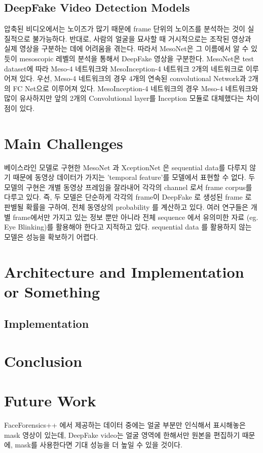 \documentclass{article}
\begin{document}
		\subsection{DeepFake Video Detection Models}
		압축된 비디오에서는 노이즈가 많기 때문에 frame 단위의 노이즈를 분석하는 것이 실질적으로 불가능하다. 반대로, 사람의 얼굴을 묘사할 때 거시적으로는 조작된 영상과 실제 영상을 구분하는 데에 어려움을 겪는다. 따라서 MesoNet은 그 이름에서 알 수 있듯이 mesoscopic 레벨의 분석을 통해서 DeepFake 영상을 구분한다. MesoNet은 test dataset에 따라 Meso-4 네트워크와 MesoInception-4 네트워크 2개의 네트워크로 이루어져 있다. 우선, Meso-4 네트워크의 경우 4개의 연속된 convolutional Network과 2개의 FC Net으로 이루어져 있다. MesoInception-4 네트워크의 경우 Meso-4 네트워크와 많이 유사하지만 앞의 2개의 Convolutional layer를 Inception 모듈로 대체했다는 차이점이 있다.
	
	
	\section{Main Challenges}
	베이스라인 모델로 구현한 MesoNet 과 XceptionNet 은 sequential data를 다루지 않기 때문에 동영상 데이터가 가지는 'temporal feature'를 모델에서 표현할 수 없다. 두 모델의 구현은 개별 동영상 프레임을 잘라내어 각각의 channel 로서 frame corpus를 다루고 있다. 즉, 두 모델은 단순하게 각각의 frame이 DeepFake 로 생성된 frame 로 판별될 확률을 구하여, 전체 동영상의 probability 를 계산하고 있다. 여러 연구들은 개별 frame에서만 가지고 있는 정보 뿐만 아니라 전체 sequence 에서 유의미한 자료 (eg. Eye Blinking)를 활용해야 한다고 지적하고 있다. sequential data 를 활용하지 않는 모델은 성능을 확보하기 어렵다.
	
	\section{Architecture and Implementation or Something}
	

	\subsection{Implementation}
	
	
	
	\section{Conclusion}
	
	\section{Future Work}
	FaceForensics++ 에서 제공하는 데이터 중에는 얼굴 부분만 인식해서 표시해놓은 mask 영상이 있는데, DeepFake video는 얼굴 영역에 한해서만 원본을 편집하기 때문에, mask를 사용한다면 기대 성능을 더 높일 수 있을 것이다. 
	
\end{document}
